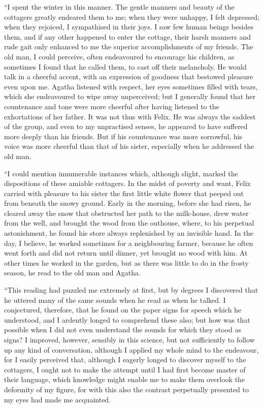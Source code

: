 \documentclass[12pt,openright]{book}
\begin{document}
“I spent the winter in this manner. The gentle manners and beauty of the cottagers greatly endeared them to me; when they were unhappy, I felt depressed; when they rejoiced, I sympathised in their joys. I saw few human beings besides them, and if any other happened to enter the cottage, their harsh manners and rude gait only enhanced to me the superior accomplishments of my friends. The old man, I could perceive, often endeavoured to encourage his children, as sometimes I found that he called them, to cast off their melancholy. He would talk in a cheerful accent, with an expression of goodness that bestowed pleasure even upon me. Agatha listened with respect, her eyes sometimes filled with tears, which she endeavoured to wipe away unperceived; but I generally found that her countenance and tone were more cheerful after having listened to the exhortations of her father. It was not thus with Felix. He was always the saddest of the group, and even to my unpractised senses, he appeared to have suffered more deeply than his friends. But if his countenance was more sorrowful, his voice was more cheerful than that of his sister, especially when he addressed the old man.

“I could mention innumerable instances which, although slight, marked the dispositions of these amiable cottagers. In the midst of poverty and want, Felix carried with pleasure to his sister the first little white flower that peeped out from beneath the snowy ground. Early in the morning, before she had risen, he cleared away the snow that obstructed her path to the milk-house, drew water from the well, and brought the wood from the outhouse, where, to his perpetual astonishment, he found his store always replenished by an invisible hand. In the day, I believe, he worked sometimes for a neighbouring farmer, because he often went forth and did not return until dinner, yet brought no wood with him. At other times he worked in the garden, but as there was little to do in the frosty season, he read to the old man and Agatha.

“This reading had puzzled me extremely at first, but by degrees I discovered that he uttered many of the same sounds when he read as when he talked. I conjectured, therefore, that he found on the paper signs for speech which he understood, and I ardently longed to comprehend these also; but how was that possible when I did not even understand the sounds for which they stood as signs? I improved, however, sensibly in this science, but not sufficiently to follow up any kind of conversation, although I applied my whole mind to the endeavour, for I easily perceived that, although I eagerly longed to discover myself to the cottagers, I ought not to make the attempt until I had first become master of their language, which knowledge might enable me to make them overlook the deformity of my figure, for with this also the contrast perpetually presented to my eyes had made me acquainted.
\end{document}
